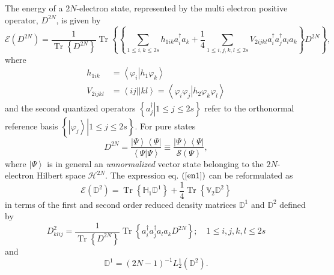 \documentclass[aps,preprint]{revtex4}%
\begin{document}
The energy of a $2N$-electron state, represented by the multi electron
positive operator, $D^{2N}$, is given by
\begin{equation}
\mathcal{E}\left(  D^{2N}\right)  =\frac{1}{\operatorname{Tr}\left\{
D^{2N}\right\}  }\operatorname{Tr}\left\{  \left\{  \sum_{1\leq i,k\leq
2s}h_{1ik}a_{i}^{\dagger}a_{k}+\frac{1}{4}\sum_{1\leq i,j,k,l\leq2s}%
V_{2ijkl}a_{i}^{\dagger}a_{j}^{\dagger}a_{l}a_{k}\right\}  D^{2N}\right\}  ,
\label{en1}%
\end{equation}
where
\begin{align}
h_{1ik}  &  =\left\langle \varphi_{i}\left\vert h_{1}\varphi_{k}\right.
\right\rangle \nonumber\\
V_{2ijkl}  &  =\left\langle ij||kl\right\rangle =\left\langle \varphi
_{i}\varphi_{j}\left\vert h_{2}\varphi_{k}\varphi_{l}\right.  \right\rangle
\end{align}
and the second quantized operators $\left\{  \left.  a_{j}^{\dagger
}\right\vert 1\leq j\leq2s\right\}  $ refer to the orthonormal reference basis
$\left\{  \left.  \left\vert \varphi_{j}\right\rangle \right\vert 1\leq
j\leq2s\right\}  $. For pure states
\begin{equation}
D^{2N}=\frac{\left\vert \Psi\right\rangle \left\langle \Psi\right\vert
}{\left\langle \Psi\left\vert \Psi\right.  \right\rangle }\equiv
\frac{\left\vert \Psi\right\rangle \left\langle \Psi\right\vert }%
{\mathcal{S}\left(  \Psi\right)  },
\end{equation}
where $\left\vert \Psi\right\rangle $ is in general an \emph{unnormalized
}vector\emph{ }state belonging to the $2N$-electron Hilbert space
$\mathcal{H}^{2N}.$ The expression eq. $\left(  \ref{en1}\right)  $ can be
reformulated as
\begin{equation}
\mathcal{E}\left(  \mathbb{D}^{2}\right)  =\operatorname{Tr}\left\{
\mathbb{H}_{1}\mathbb{D}^{1}\right\}  +\frac{1}{4}\operatorname{Tr}\left\{
\mathbb{V}_{2}\mathbb{D}^{2}\right\}
\end{equation}
in terms of the first and second order reduced density matrices $\mathbb{D}%
^{1}$ and $\mathbb{D}^{2}$ defined by
\begin{equation}
D_{klij}^{2}=\frac{1}{\operatorname{Tr}\left\{  D^{2N}\right\}  }%
\operatorname{Tr}\left\{  a_{i}^{\dagger}a_{j}^{\dagger}a_{l}a_{k}%
D^{2N}\right\}  ;\quad1\leq i,j,k,l\leq2s
\end{equation}
and
\begin{equation}
\mathbb{D}^{1}=\left(  2N-1\right)  ^{-1}L_{2}^{1}\left(  \mathbb{D}%
^{2}\right)  .
\end{equation}
\end{document}
